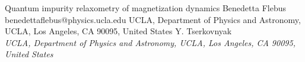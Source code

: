 \begin{conf-abstract}[]
{Quantum impurity relaxometry of magnetization dynamics}
{\color{blue} Benedetta Flebus}
{benedettaflebus@physics.ucla.edu}
{UCLA, Department of Physics and Astronomy, UCLA, Los Angeles, CA 90095, United States}
{{\color{blue}Y. Tserkovnyak}\\ \textit{UCLA, Department of Physics and Astronomy, UCLA, Los Angeles, CA 90095, United States}\\ 
\decofourleft \decofourright}





\printbibliography[heading=none]

\end{conf-abstract}
